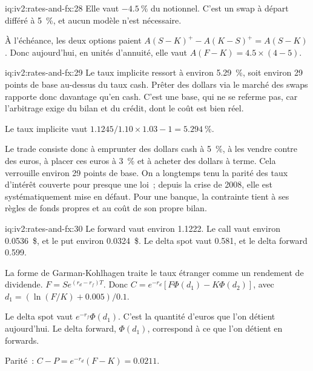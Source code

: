 \begin{solution}{iq:iv2:rates-and-fx:28}
Elle vaut $-4.5~\%$ du notionnel. C'est un swap à départ différé à 5~\%, et aucun modèle n'est nécessaire.

À l'échéance, les deux options paient $A(S - K)^+ - A(K - S)^+ = A(S - K)$. Donc aujourd'hui, en unités d'annuité, elle vaut $A(F - K) = 4.5 \times (4 - 5)$.

\end{solution}

\begin{solution}{iq:iv2:rates-and-fx:29}
Le taux implicite ressort à environ 5.29~\%, soit environ 29 points de base au-dessus du taux cash. Prêter des dollars via le marché des swaps rapporte donc davantage qu'en cash. C'est une base, qui ne se referme pas, car l'arbitrage exige du bilan et du crédit, dont le coût est bien réel.

Le taux implicite vaut $1.1245/1.10 \times 1.03 - 1 = 5.294~\%$.

Le trade consiste donc à emprunter des dollars cash à 5~\%, à les vendre contre des euros, à placer ces euros à 3~\% et à acheter des dollars à terme. Cela verrouille environ 29 points de base. On a longtemps tenu la parité des taux d'intérêt couverte pour presque une loi~; depuis la crise de 2008, elle est systématiquement mise en défaut. Pour une banque, la contrainte tient à ses règles de fonds propres et au coût de son propre bilan.

\end{solution}

\begin{solution}{iq:iv2:rates-and-fx:30}
Le forward vaut environ 1.1222. Le call vaut environ 0.0536~\$, et le put environ 0.0324~\$. Le delta spot vaut 0.581, et le delta forward 0.599.

La forme de Garman-Kohlhagen traite le taux étranger comme un rendement de dividende. $F = Se^{(r_d - r_f)T}$. Donc $C = e^{-r_d}[F\Phi(d_1) - K\Phi(d_2)]$, avec $d_1 = (\ln(F/K) + 0.005)/0.1$.

Le delta spot vaut $e^{-r_f}\Phi(d_1)$. C'est la quantité d'euros que l'on détient aujourd'hui. Le delta forward, $\Phi(d_1)$, correspond à ce que l'on détient en forwards.

Parité~: $C - P = e^{-r_d}(F - K) = 0.0211$.

\end{solution}

